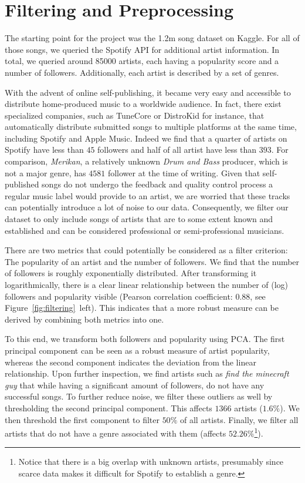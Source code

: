 \documentclass{article}
\newcommand{\todo}[1]{{\color{red} #1}}
\begin{document}
\section{Filtering and Preprocessing}

The starting point for the project was the 1.2m song dataset on Kaggle. For all of those songs, we queried the Spotify API for additional artist information. In total, we queried around \num[]{85 000} artists, each having a popularity score and a number of followers. Additionally, each artist is described by a set of genres.

With the advent of online self-publishing, it became very easy and accessible to distribute home-produced music to a worldwide audience. In fact, there exist specialized companies, such as TuneCore or DistroKid for instance, that automatically distribute submitted songs to multiple platforms at the same time, including Spotify and Apple Music. Indeed we find that a quarter of artists on Spotify have less than $45$ followers and half of all artist have less than $393$. For comparison, \emph{Merikan}, a relatively unknown \emph{Drum and Bass} producer, which is not a major genre, has $4581$ follower at the time of writing. Given that self-published songs do not undergo the feedback and quality control process a regular music label would provide to an artist, we are worried that these tracks can potentially introduce a lot of noise to our data. Consequently, we filter our dataset to only include songs of artists that are to some extent known and established and can be considered professional or semi-professional musicians.

There are two metrics that could potentially be considered as a filter criterion: The popularity of an artist and the number of followers. We find that the number of followers is roughly exponentially distributed. After transforming it logarithmically, there is a clear linear relationship between the number of (log) followers and popularity visible (Pearson correlation coefficient: $0.88$, see Figure~\ref{fig:filtering}~left). This indicates that a more robust measure can be derived by combining both metrics into one.

To this end, we transform both followers and popularity using PCA. The first principal component can be seen as a robust measure of artist popularity, whereas the second component indicates the deviation from the linear relationship. Upon further inspection, we find artists such as \emph{\todo{find the minecraft guy}} that while having a significant amount of followers, do not have any successful songs. To further reduce noise, we filter these outliers as well by thresholding the second principal component. This affects $1366$ artists ($1.6\%$). We then threshold the first component to filter $50\%$ of all artists. Finally, we filter all artists that do not have a genre associated with them (affects $52.26\%$\footnote{Notice that there is a big overlap with unknown artists, presumably since scarce data makes it difficult for Spotify to establish a genre.}).
\end{document}
